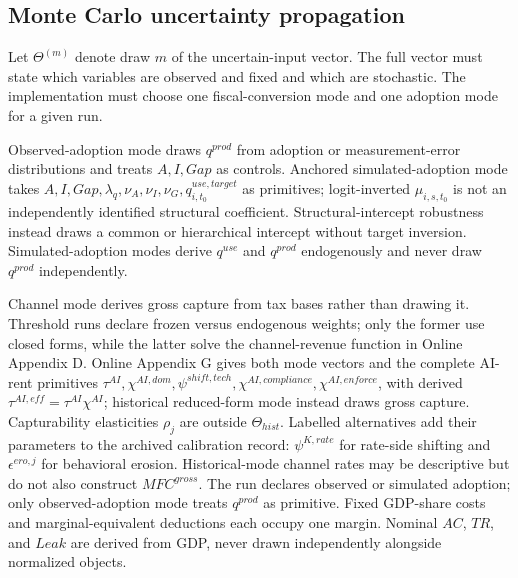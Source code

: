 \documentclass[11pt,a4paper]{article}
\begin{document}
\subsection{Monte Carlo uncertainty propagation}\label{subsec:mc_main}

Let $\Theta^{(m)}$ denote draw $m$ of the uncertain-input vector. The full vector must state which variables are observed and fixed and which are stochastic. The implementation must choose one fiscal-conversion mode and one adoption mode for a given run.

Observed-adoption mode draws $q^{prod}$ from adoption or measurement-error distributions and treats $A,I,Gap$ as controls. Anchored simulated-adoption mode takes $A,I,Gap,\lambda_q,\nu_A,\nu_I,\nu_G,q^{use,target}_{i,t_0}$ as primitives; logit-inverted $\mu_{i,s,t_0}$ is not an independently identified structural coefficient. Structural-intercept robustness instead draws a common or hierarchical intercept without target inversion. Simulated-adoption modes derive $q^{use}$ and $q^{prod}$ endogenously and never draw $q^{prod}$ independently.

Channel mode derives gross capture from tax bases rather than drawing it. Threshold runs declare frozen versus endogenous weights; only the former use closed forms, while the latter solve the channel-revenue function in Online Appendix D. Online Appendix G gives both mode vectors and the complete AI-rent primitives $\tau^{AI},\chi^{AI,dom},\psi^{shift,tech},\chi^{AI,compliance},\chi^{AI,enforce}$, with derived $\tau^{AI,eff}=\tau^{AI}\chi^{AI}$; historical reduced-form mode instead draws gross capture.
Capturability elasticities $\rho_j$ are outside $\Theta_{hist}$. Labelled alternatives add their parameters to the archived calibration record: $\psi^{K,rate}$ for rate-side shifting and $\epsilon^{ero,j}$ for behavioral erosion.
Historical-mode channel rates may be descriptive but do not also construct $MFC^{gross}$. The run declares observed or simulated adoption; only observed-adoption mode treats $q^{prod}$ as primitive. Fixed GDP-share costs and marginal-equivalent deductions each occupy one margin. Nominal $AC$, $TR$, and $Leak$ are derived from GDP, never drawn independently alongside normalized objects.
\end{document}
